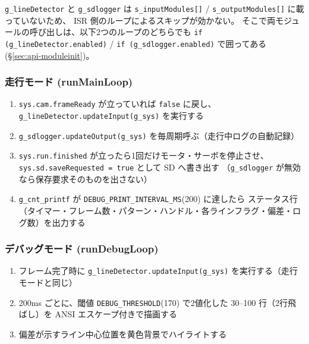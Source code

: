 \documentclass[a4paper,11pt,dvipdfmx]{jsarticle}
\begin{document}
\begin{notebox}
\texttt{g\_lineDetector} と \texttt{g\_sdlogger} は
\texttt{s\_inputModules[]} / \texttt{s\_outputModules[]} に載っていないため、
ISR 側のループによるスキップが効かない。
そこで両モジュールの呼び出しは、以下2つのループのどちらでも
\texttt{if (g\_lineDetector.enabled)} / \texttt{if (g\_sdlogger.enabled)} で囲ってある
(\hyperref[sec:api-moduleinit]{§\ref*{sec:api-moduleinit}})。
\end{notebox}

\subsubsection{走行モード (runMainLoop)}

\begin{enumerate}[nosep, leftmargin=*]
  \item \texttt{sys.cam.frameReady} が立っていれば \texttt{false} に戻し、
        \texttt{g\_lineDetector.updateInput(g\_sys)} を実行する
  \item \texttt{g\_sdlogger.updateOutput(g\_sys)} を毎周期呼ぶ（走行中ログの自動記録）
  \item \texttt{sys.run.finished} が立ったら1回だけモータ・サーボを停止させ、
        \texttt{sys.sd.saveRequested = true} として SD へ書き出す
        （\texttt{g\_sdlogger} が無効なら保存要求そのものを出さない）
  \item \texttt{g\_cnt\_printf} が \texttt{DEBUG\_PRINT\_INTERVAL\_MS}(200) に達したら
        ステータス行（タイマー・フレーム数・パターン・ハンドル・各ラインフラグ・偏差・ログ数）を出力する
\end{enumerate}

\subsubsection{デバッグモード (runDebugLoop)}

\begin{enumerate}[nosep, leftmargin=*]
  \item フレーム完了時に \texttt{g\_lineDetector.updateInput(g\_sys)} を実行する（走行モードと同じ）
  \item 200ms ごとに、閾値 \texttt{DEBUG\_THRESHOLD}(170) で2値化した
        30--100 行（2行飛ばし）を ANSI エスケープ付きで描画する
  \item 偏差が示すライン中心位置を黄色背景でハイライトする
\end{enumerate}
\end{document}
